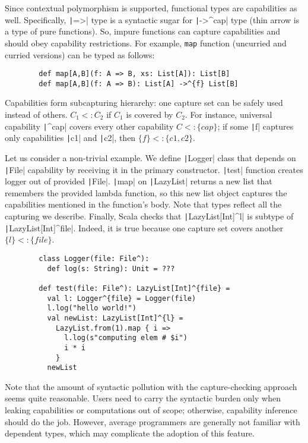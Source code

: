 \documentclass[conference]{IEEEtran}
\begin{document}
    Since contextual polymorphism is supported, functional types are capabilities as well.
    Specifically, \texttt|=>| type is a syntactic sugar for \texttt|->^{cap}| type (thin arrow is a type of pure functions).
    So, impure functions can capture capabilities and should obey capability restrictions.
    For example, \texttt{map} function (uncurried and curried versions) can be typed as follows:
    \begin{verbatim}
        def map[A,B](f: A => B, xs: List[A]): List[B]
        def map[A,B](f: A => B): List[A] ->^{f} List[B]
    \end{verbatim}

    Capabilities form subcapturing hierarchy: one capture set can be safely used instead of others.
    $C_1 <: C_2$ if $C_1$ is covered by $C_2$.
    For instance, universal capability \texttt|^{cap}| covers every other capability $C <: \{cap\}$; if some \texttt|f| captures only capabilities \texttt|c1| and \texttt|c2|, then $\{f\} <: \{c1, c2\}$.

    Let us consider a non-trivial example.
    We define \texttt|Logger| class that depends on \texttt|File| capability by receiving it in the primary constructor.
    \texttt|test| function creates logger out of provided \texttt|File|.
    \texttt|map| on \texttt|LazyList| returns a new list that remembers the provided lambda function, so this new list object captures the capabilities mentioned in the function's body.
    Note that types reflect all the capturing we describe.
    Finally, Scala checks that \texttt|LazyList[Int]^{l}| is subtype of \texttt|LazyList[Int]^{file}|.
    Indeed, it is true because one capture set covers another $\{l\} <: \{file\}$.
    \begin{verbatim}
        class Logger(file: File^):
          def log(s: String): Unit = ???

        def test(file: File^): LazyList[Int]^{file} =
          val l: Logger^{file} = Logger(file)
          l.log("hello world!")
          val newList: LazyList[Int]^{l} =
            LazyList.from(1).map { i =>
              l.log(s"computing elem # $i")
              i * i
            }
          newList
    \end{verbatim}

    Note that the amount of syntactic pollution with the capture-checking approach seems quite reasonable.
    Users need to carry the syntactic burden only when leaking capabilities or computations out of scope; otherwise, capability inference should do the job.
    However, average programmers are generally not familiar with dependent types, which may complicate the adoption of this feature.
\end{document}
